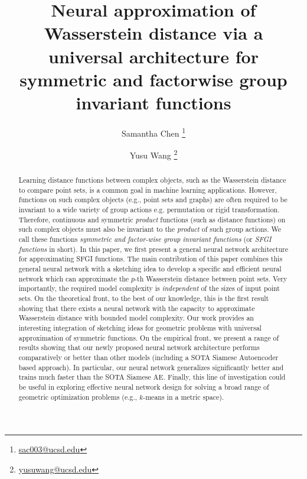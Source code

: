 \documentclass[12pt]{article}
\newcommand{\ourfunc}  {{symmetric and factor-wise group invariant function}}
\newcommand{\SFGI} {{SFGI}}
\begin{document}
\title{Neural approximation of Wasserstein distance via a universal architecture for symmetric and factorwise group invariant functions}

\author[1]{ Samantha Chen \thanks{\url{sac003@ucsd.edu}}}
\author[1, 2]{Yusu Wang \thanks{\url{yusuwang@ucsd.edu}}}


\maketitle
\maketitle


\begin{abstract}
Learning distance functions between complex objects, such as the Wasserstein distance to compare point sets, is a common goal in machine learning applications. However, functions on such complex objects (e.g., point sets and graphs) are often required to be invariant to a wide variety of group actions e.g. permutation or rigid transformation. 
Therefore, continuous and symmetric \textit{product} functions (such as distance functions) on such complex objects must also be invariant to the \textit{product} of such group actions. 
We call these functions \emph{\ourfunc{}s} (or \emph{\SFGI{} functions} in short).
In this paper, we first present a general neural network architecture for approximating \SFGI{} functions. The main contribution of this paper combines this general neural network with a sketching idea to develop a specific and efficient neural network which can approximate the $p$-th Wasserstein distance between point sets.
Very importantly, the required model complexity is \emph{independent} of the sizes of input point sets. 
On the theoretical front, to the best of our knowledge, this is the first result showing that there exists a neural network with the capacity to approximate Wasserstein distance with bounded model complexity. Our work provides an interesting integration of sketching ideas for geometric problems with universal approximation of symmetric functions. 
On the empirical front, we present a range of results showing that our newly proposed neural network architecture performs comparatively or better than other models (including a SOTA Siamese Autoencoder based approach). In particular, our neural network generalizes significantly better and trains much faster than the SOTA Siamese AE.
Finally, this line of investigation could be useful in exploring effective neural network design for solving a broad range of geometric optimization problems (e.g., $k$-means in a metric space).
\end{abstract}
\end{document}
